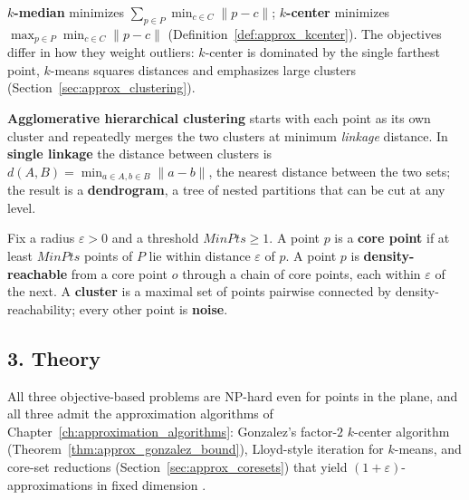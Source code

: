 \begin{definition}\label{def:data_ml_kmedian}
  \textbf{$k$-median} minimizes $\sum_{p \in P} \min_{c \in C} \|p - c\|$;
  \textbf{$k$-center} minimizes $\max_{p \in P} \min_{c \in C} \|p - c\|$
  (Definition~\ref{def:approx_kcenter}). The objectives differ in how they
  weight outliers: $k$-center is dominated by the single farthest point,
  $k$-means squares distances and emphasizes large clusters
  (Section~\ref{sec:approx_clustering}).
\end{definition}

\begin{definition}\label{def:data_ml_single_linkage}
  \textbf{Agglomerative hierarchical clustering} starts with each point as its own cluster and repeatedly merges
  the two clusters at minimum \emph{linkage} distance. In
  \textbf{single linkage} the distance between clusters is
  $d(A,B) = \min_{a \in A, b \in B} \|a - b\|$, the nearest distance between
  the two sets; the result is a \textbf{dendrogram}, a tree of nested
  partitions that can be cut at any level.
\end{definition}

\begin{definition}\label{def:data_ml_dbscan}
  Fix a radius $\varepsilon > 0$ and a threshold $\mathit{MinPts} \geq 1$.
  A point $p$ is a \textbf{core point} if at least
  $\mathit{MinPts}$ points of $P$ lie within distance $\varepsilon$ of $p$.
  A point $p$ is \textbf{density-reachable} from a core point $o$ through a
  chain of core points, each within $\varepsilon$ of the next. A
  \textbf{cluster} is a maximal set of points pairwise connected by
  density-reachability; every other point is \textbf{noise}.
\end{definition}

\subsection{3. Theory}

All three objective-based problems are NP-hard even for points in the plane,
and all three admit the approximation algorithms of Chapter~\ref{ch:approximation_algorithms}:
Gonzalez's factor-$2$ $k$-center algorithm
(Theorem~\ref{thm:approx_gonzalez_bound}), Lloyd-style iteration for
$k$-means, and core-set reductions (Section~\ref{sec:approx_coresets}) that
yield $(1 + \varepsilon)$-approximations in fixed dimension
\cite{harpeled2011,gonzalez1985,lloyd1982}.

